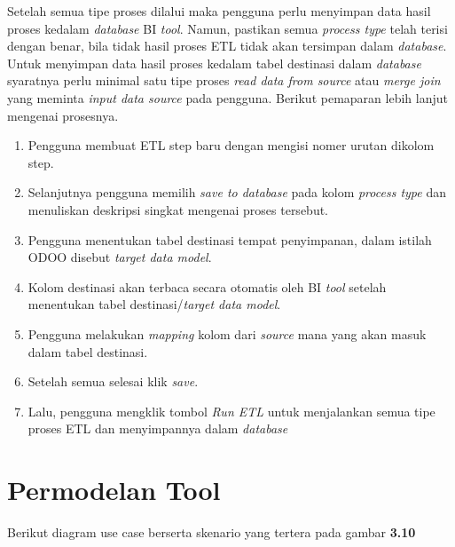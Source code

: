 	Setelah semua tipe proses dilalui maka pengguna perlu menyimpan data hasil proses kedalam \textit{database} BI \textit{tool}. Namun, pastikan semua \textit{process type} telah terisi dengan benar, bila tidak hasil proses ETL tidak akan tersimpan dalam \textit{database}.  Untuk menyimpan data hasil proses kedalam tabel destinasi dalam \textit{database} syaratnya perlu minimal satu tipe proses \textit{read data from source} atau \textit{merge join} yang meminta \textit{input data source} pada pengguna. Berikut pemaparan lebih lanjut mengenai prosesnya.
\begin{enumerate}
	\item Pengguna membuat ETL step baru dengan mengisi nomer urutan dikolom step.
	\item Selanjutnya pengguna memilih \textit{save to database} pada kolom \textit{process type} dan menuliskan deskripsi singkat mengenai proses tersebut.
	\item Pengguna menentukan tabel destinasi tempat penyimpanan, dalam istilah ODOO disebut \textit{target data model}.
	\item Kolom destinasi akan terbaca secara otomatis oleh BI \textit{tool} setelah menentukan tabel destinasi/\textit{target data model}.
	\item Pengguna melakukan \textit{mapping} kolom dari \textit{source} mana yang akan masuk dalam tabel destinasi.
	\item Setelah semua selesai klik \textit{save}.
	\item Lalu, pengguna mengklik tombol \textit{Run ETL} untuk menjalankan semua tipe proses ETL dan menyimpannya dalam \textit{database}
\end{enumerate}
	
\section{Permodelan Tool}

Berikut diagram use case berserta skenario yang tertera pada gambar \textbf{3.10}

